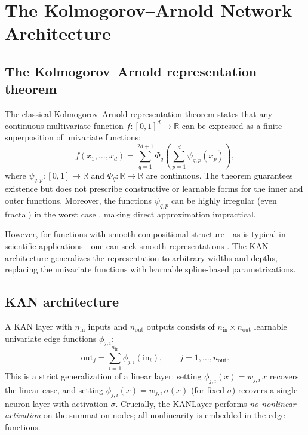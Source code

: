 \documentclass[11pt]{article}
\newcommand{\R}{\mathbb{R}}
\theoremstyle{remark}
\begin{document}
\section{The Kolmogorov--Arnold Network Architecture}
\label{sec:KAN}

\subsection{The Kolmogorov--Arnold representation theorem}

The classical Kolmogorov--Arnold representation theorem \cite{kolmogorov1957representation} states that any continuous multivariate function $f:[0,1]^d \to \R$ can be expressed as a finite superposition of univariate functions:
\begin{equation}\label{eq:KAT}
f(x_1,\ldots,x_d) = \sum_{q=1}^{2d+1} \Phi_q\!\left(\sum_{p=1}^d \psi_{q,p}(x_p)\right),
\end{equation}
where $\psi_{q,p}:[0,1] \to \R$ and $\Phi_q:\R \to \R$ are continuous. The theorem guarantees existence but does not prescribe constructive or learnable forms for the inner and outer functions. Moreover, the functions $\psi_{q,p}$ can be highly irregular (even fractal) in the worst case \cite{braun2009constructive}, making direct approximation impractical.

However, for functions with smooth compositional structure---as is typical in scientific applications---one can seek smooth representations \cite{lai2021kolmogorov}. The KAN architecture \cite{liu2024kan} generalizes the representation to arbitrary widths and depths, replacing the univariate functions with learnable spline-based parametrizations.

\subsection{KAN architecture}

A KAN layer with $n_{\mathrm{in}}$ inputs and $n_{\mathrm{out}}$ outputs consists of $n_{\mathrm{in}} \times n_{\mathrm{out}}$ learnable univariate edge functions $\phi_{j,i}$:
\begin{equation}\label{eq:KAN_layer}
\mathrm{out}_j = \sum_{i=1}^{n_{\mathrm{in}}} \phi_{j,i}(\mathrm{in}_i), \qquad j = 1,\ldots,n_{\mathrm{out}}.
\end{equation}
This is a strict generalization of a linear layer: setting $\phi_{j,i}(x) = w_{j,i}\,x$ recovers the linear case, and setting $\phi_{j,i}(x) = w_{j,i}\,\sigma(x)$ (for fixed $\sigma$) recovers a single-neuron layer with activation $\sigma$. Crucially, the KANLayer performs \emph{no nonlinear activation} on the summation nodes; all nonlinearity is embedded in the edge functions.
\end{document}

